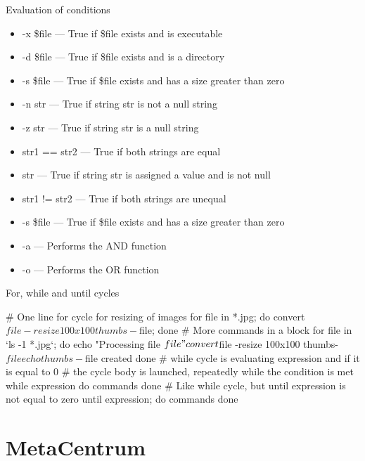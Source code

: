 \documentclass[hyperref={bookmarks=true, unicode=true, colorlinks=true, pdftitle={Linux, command line and MetaCentrum}, plainpages=false, pdfauthor={Vojtech Zeisek}, pdfsubject={Course about use of Linux command line, writing shell scripts and using MetaCentrum of CESNET}, pdfcreator={XeLaTeX, http://www.xelatex.org/}, pdfkeywords={Linux, GNU, BASH, shell, command line, MetaCentrum}, linkcolor=Sienna, anchorcolor=black, citecolor=green, filecolor=magenta, menucolor=Sienna, urlcolor=cyan, pdftex}, compress, ucs, xelatex, xcolor=svgnames, 11pt]{beamer}
\begin{document}
\begin{frame}[allowframebreaks]{Evaluation of conditions}
\begin{itemize}
  \item -x \$file --- True if \$file exists and is executable
  \item -d \$file --- True if \$file exists and is a directory
  \item -s \$file --- True if \$file exists and has a size greater than zero
  \item -n str --- True if string str is not a null string
  \item -z str --- True if string str is a null string
  \item str1 == str2 --- True if both strings are equal
  \item str --- True if string str is assigned a value and is not null
  \item str1 != str2 --- True if both strings are unequal
  \item -s \$file --- True if \$file exists and has a size greater than zero
  \item -a --- Performs the AND function
  \item -o --- Performs the OR function
\end{itemize}
\end{frame}

\begin{frame}[fragile]{For, while and until cycles}
  \begin{bashcode}
    # One line for cycle for resizing of images
    for file in *.jpg; do convert $file -resize 100x100 thumbs-$file; done
    # More commands in a block
    for file in `ls -1 *.jpg`; do
      echo "Processing file $file"
      convert $file -resize 100x100 thumbs-$file
      echo thumbs-$file created
      done
    # while cycle is evaluating expression and if it is equal to 0
    # the cycle body is launched, repeatedly while the condition is met
    while expression
      do
        commands
      done
    # Like while cycle, but until expression is not equal to zero
    until expression; do
      commands
      done
  \end{bashcode}
\end{frame}

\section{MetaCentrum}
\end{document}
